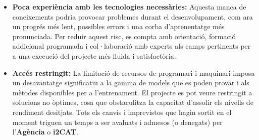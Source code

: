 \begin{itemize}
    \item \textbf{Poca experiència amb les tecnologies necessàries:} Aquesta manca de coneixements podria provocar problemes durant el desenvolupament, com ara un progrés més lent, possibles errors i una corba d'aprenentatge més pronunciada. Per reduir aquest risc, es compta amb orientació, formació addicional programada i col·laboració amb experts als camps pertinents per a una execució del projecte més fluida i satisfactòria.
    \item \textbf{Accés restringit:} La limitació de recursos de programari i maquinari imposa un desavantatge significatiu a la gamma de models que es poden provar i als mètodes disponibles per a l'entrenament. El projecte es pot veure restringit a solucions no òptimes, cosa que obstaculitza la capacitat d'assolir els nivells de rendiment desitjats. Tots els canvis i imprevistos que hagin sortit en el moment triguen un temps a ser avaluats i admesos (o denegats) per l'\textbf{Agència} o \textbf{i2CAT}.
\end{itemize}
